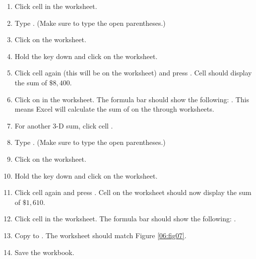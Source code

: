 \begin{enumerate}
	\item Click cell  in the  worksheet.
	\item Type . (Make sure to type the open parentheses.)
	\item Click on the  worksheet.
	\item Hold the  key down and click on the  worksheet.
	\item Click cell  again (this will be on the  worksheet) and press . Cell  should display the sum of $ \$8,400 $.
	\item Click on  in the  worksheet. The formula bar should show the following: . This means Excel will calculate the sum of  on the  through  worksheets.
	\item For another $ 3 $-D sum, click cell .
	\item Type . (Make sure to type the open parentheses.)
	\item Click on the  worksheet.
	\item Hold the  key down and click on the  worksheet.
	\item Click cell  again and press . Cell  on the  worksheet should now display the sum of $ \$1,610 $.
	\item Click cell  in the  worksheet. The formula bar should show the following: .
	\item Copy  to . The  worksheet should match Figure \ref{06:fig07}.
	\item Save the  workbook.
\end{enumerate}

